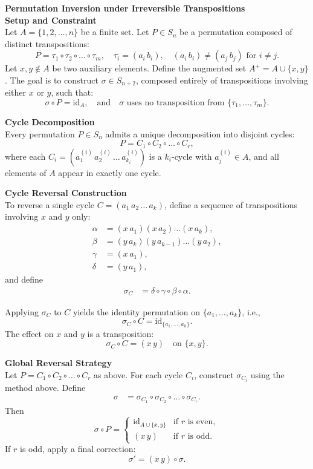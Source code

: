 \begin{technical}
{\Large\textbf{Permutation Inversion under Irreversible Transpositions}}\\[0.7em]

\noindent\textbf{Setup and Constraint}\\[0.5em]
Let \( A = \{1, 2, \dots, n\} \) be a finite set. Let \( P \in S_n \) be a permutation composed of distinct transpositions:
\[
P = \tau_1 \circ \tau_2 \circ \dots \circ \tau_m, \quad \tau_i = (a_i\, b_i), \quad (a_i\, b_i) \neq (a_j\, b_j) \text{ for } i \neq j.
\]
Let \( x, y \notin A \) be two auxiliary elements. Define the augmented set \( A^+ = A \cup \{x, y\} \). The goal is to construct \( \sigma \in S_{n+2} \), composed entirely of transpositions involving either \( x \) or \( y \), such that:
\[
\sigma \circ P = \text{id}_{A}, \quad \text{and} \quad \sigma \text{ uses no transposition from } \{\tau_1, \dots, \tau_m\}.
\]

\noindent\textbf{Cycle Decomposition}\\[0.5em]
Every permutation \( P \in S_n \) admits a unique decomposition into disjoint cycles:
\[
P = C_1 \circ C_2 \circ \dots \circ C_r,
\]
where each \( C_i = (a^{(i)}_1\, a^{(i)}_2\, \dots\, a^{(i)}_{k_i}) \) is a \( k_i \)-cycle with \( a^{(i)}_j \in A \), and all elements of \( A \) appear in exactly one cycle.

\noindent\textbf{Cycle Reversal Construction}\\[0.5em]
To reverse a single cycle \( C = (a_1\, a_2\, \dots\, a_k) \), define a sequence of transpositions involving \( x \) and \( y \) only:
\begin{align}
\alpha &= (x\, a_1)(x\, a_2)\dots(x\, a_k), \\
\beta  &= (y\, a_k)(y\, a_{k-1})\dots(y\, a_2), \\
\gamma &= (x\, a_1), \\
\delta &= (y\, a_1),
\end{align}
and define
\begin{align}
\sigma_C &= \delta \circ \gamma \circ \beta \circ \alpha.
\end{align}

Applying \( \sigma_C \) to \( C \) yields the identity permutation on \( \{a_1, \dots, a_k\} \), i.e.,
\[
\sigma_C \circ C = \text{id}_{\{a_1, \dots, a_k\}}.
\]
The effect on \( x \) and \( y \) is a transposition:
\[
\sigma_C \circ C = (x\, y) \quad \text{on } \{x, y\}.
\]

\noindent\textbf{Global Reversal Strategy}\\[0.5em]
Let \( P = C_1 \circ C_2 \circ \dots \circ C_r \) as above. For each cycle \( C_i \), construct \( \sigma_{C_i} \) using the method above. Define
\begin{align}
\sigma &= \sigma_{C_1} \circ \sigma_{C_2} \circ \dots \circ \sigma_{C_r}.
\end{align}
Then
\[
\sigma \circ P =
\begin{cases}
\text{id}_{A \cup \{x, y\}} & \text{if } r \text{ is even}, \\
(x\, y) & \text{if } r \text{ is odd}.
\end{cases}
\]
If \( r \) is odd, apply a final correction:
\[
\sigma' = (x\, y) \circ \sigma.
\]


\end{technical}
